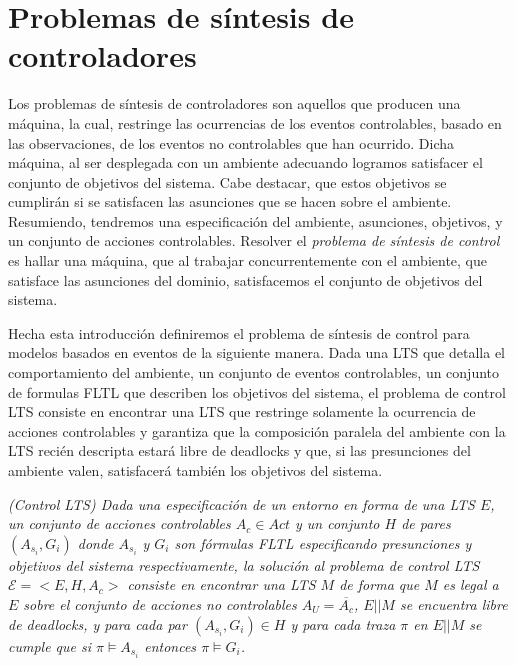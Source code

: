 \section{Problemas de síntesis de controladores}

Los problemas de síntesis de controladores son aquellos que producen una máquina, la cual, restringe las ocurrencias de
los eventos controlables, basado en las observaciones, de los eventos no controlables que han ocurrido. Dicha máquina, al
ser desplegada con un ambiente adecuando logramos satisfacer el conjunto de objetivos del sistema. Cabe destacar, que
estos objetivos se cumplirán si se satisfacen las asunciones que se hacen sobre el ambiente. Resumiendo, tendremos una
especificación del ambiente, asunciones, objetivos, y un conjunto de acciones controlables. Resolver el \emph{problema
de síntesis de control} es hallar una máquina, que al trabajar concurrentemente con el ambiente, que satisface las
asunciones del dominio, satisfacemos el conjunto de objetivos del sistema.

Hecha esta introducción definiremos el problema de síntesis de control para modelos basados en eventos de la siguiente
manera. Dada una LTS que detalla el comportamiento del ambiente, un conjunto de eventos controlables, un conjunto de
formulas FLTL que describen los objetivos del sistema, el problema de control LTS consiste en encontrar una LTS que
restringe solamente la ocurrencia de acciones controlables y garantiza que la composición paralela del ambiente con la
LTS recién descripta estará libre de deadlocks y que, si las presunciones del ambiente valen, satisfacerá también los
objetivos del sistema.

\begin{nahaDef}
    \emph{(Control LTS) Dada una especificación de un entorno en forma de una LTS $E$, un conjunto de acciones
    controlables $A_c \in Act$ y un conjunto $H$ de pares $(A_{s_i}, G_i)$ donde $A_{s_i}$ y $G_i$ son fórmulas FLTL
    especificando presunciones y objetivos del sistema respectivamente, la solución al problema de control LTS
    $\mathcal{E} = <E,H,A_c>$ consiste en encontrar una LTS $M$ de forma que $M$ es legal a $E$ sobre el conjunto de acciones
    no controlables $A_U = \overline{A_c}$, $E||M$ se encuentra libre de deadlocks, y para cada par $(A_{s_i}, G_i) \in
    H$ y para cada traza $\pi$ en $E||M$ se cumple que si $\pi \vDash A_{s_i}$ entonces $\pi \vDash G_i$.}
\end{nahaDef}

